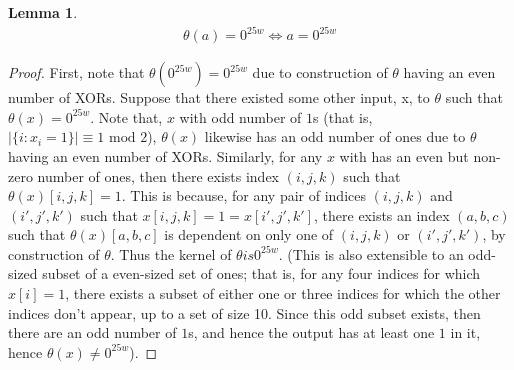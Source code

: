 \documentclass[10pt,twocolumn,twoside]{pnas-new}
\newtheorem{lemma}[theorem]{Lemma}
\begin{document}
\begin{lemma} \label{lem:p:t:1}
\begin{align*}
    \theta(a) = 0^{25w} \iff a = 0^{25w}
\end{align*}
\end{lemma}
\begin{proof}

First, note that $\theta(0^{25w}) = 0^{25w}$ due to construction of $\theta$
having an even number of XORs. Suppose that there existed some other input, x,
to $\theta$ such that $\theta(x) = 0^{25w}$. Note that, $x$ with odd number of
$1$s (that is, $|\{ i : x_{i} = 1 \}| \equiv 1 \text { mod } 2$), $\theta(x)$
likewise has an odd number of ones due to $\theta$ having an even number of
XORs. Similarly, for any $x$ with has an even but non-zero number of ones,
then there exists index $(i, j, k)$ such that $\theta(x)[i, j, k] = 1$. This is
because, for any pair of indices $(i, j, k)$ and $(i', j', k')$ such that
$x[i, j, k] = 1 = x[i', j', k']$, there exists an index $(a, b, c)$ such that
$\theta(x)[a, b, c]$ is dependent on only one of $(i, j, k)$ or $(i', j', k')$,
by construction of $\theta$. Thus the kernel of $\theta is 0^{25w}$. (This is
also extensible to an odd-sized subset of a even-sized set of ones; that is,
for any four indices for which $x[i] = 1$, there exists a subset of either
one or three indices for which the other indices don't appear, up to a set of
size 10. Since this odd subset exists, then there are an odd number of $1$s,
and hence the output has at least one $1$ in it, hence $\theta(x) \neq 0^{25w}$).

\end{proof}
\end{document}
